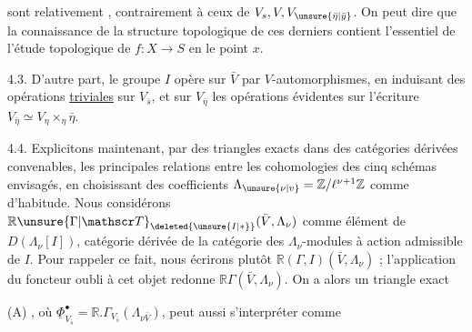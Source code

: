 
sont relativement  , contrairement à  ceux de $V_s,V,V_{\unsure{\bar\eta|\bar y}}$.  On peut dire que la   connaissance de la structure topologique de ces derniers contient  l'essentiel de  l'étude topologique de $f:X\longrightarrow S$ en le point $x$.

4.3. D'autre part, le groupe $I$ opère sur $\bar V$  par $V$-automorphismes, en induisant des opérations \uline{triviales} sur $V_{\bar s}$, et sur $V_{\bar\eta}$ les opérations évidentes sur l'écriture $V_{\bar\eta}\simeq V_\eta\times_\eta\bar\eta$.

4.4. Explicitons maintenant, par des triangles exacts dans des catégories dérivées convenables, les principales relations \deleted{\unsure{\&}} entre les cohomologies des cinq schémas envisagés, en choisissant des coefficients $\Lambda_{\unsure{\nu|v}}=\mathbb Z/\ell^{\nu+1}\mathbb Z$ comme d'habitude. Nous considérons $\mathbb R\unsure{\Gamma|\mathscr T}_{\deleted{\unsure{I|*}}}(\bar V,\Lambda_\nu)$ comme élément de $D(\Lambda_\nu[I])$, catégorie dérivée de la catégorie des $\Lambda_\nu$-modules à action admissible de $I$. Pour rappeler ce fait, nous écrirons plutôt $\mathbb R(\Gamma,I)(\bar V,\Lambda_\nu)$ ; l'application du foncteur oubli à cet objet redonne $\mathbb R\Gamma(\bar V,\Lambda_\nu)$. On a alors un triangle exact

 (A)
,
où $\underline\Phi^\bullet_{V_{\bar s}}=\mathbb R.\Gamma_{V_{\bar s}}(\Lambda_{\nu\bar V})$, peut aussi s'interpréter comme
